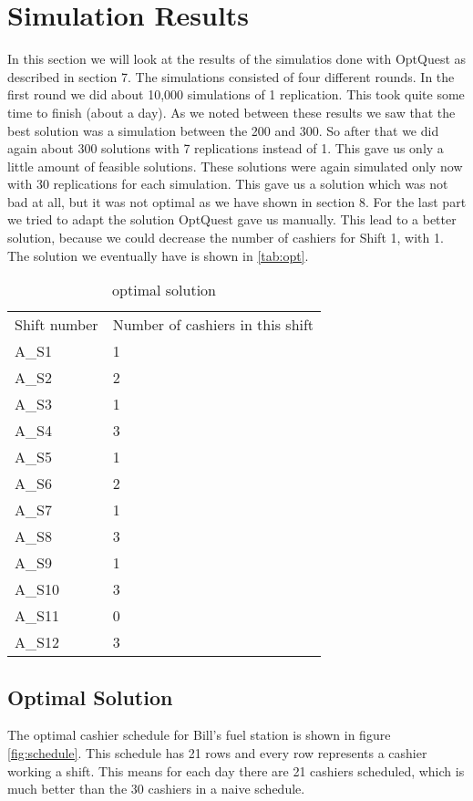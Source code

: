 \section{Simulation Results}
In this section we will look at the results of the simulatios done with OptQuest as described in section 7. 
The simulations consisted of four different rounds. 
In the first round we did about 10,000 simulations of 1 replication. 
This took quite some time to finish (about a day).
As we noted between these results we saw that the best solution was a simulation between the 200 and 300.
So after that we did again about 300 solutions with 7 replications instead of 1.
This gave us only a little amount of feasible solutions. 
These solutions were again simulated only now with 30 replications for each simulation.
This gave us a solution which was not bad at all, but it was not optimal as we have shown in section 8.
For the last part we tried to adapt the solution OptQuest gave us manually.
This lead to a better solution, because we could decrease the number of cashiers for Shift 1, with 1.
The solution we eventually have is shown in \autoref{tab:opt}.

\begin{table}
	\centering
	\caption{optimal solution}
	\begin{tabular}{l | l}
		Shift number & Number of cashiers in this shift\\
		A\_S1 & 1 \\
		A\_S2 & 2 \\
		A\_S3 & 1 \\
		A\_S4 & 3 \\
		A\_S5 & 1 \\
		A\_S6 & 2 \\
		A\_S7 & 1 \\
		A\_S8 & 3 \\
		A\_S9 & 1 \\
		A\_S10 & 3 \\
		A\_S11 & 0 \\
		A\_S12 & 3 \\
	\end{tabular}
	\label{tab:opt}
\end{table}

\subsection{Optimal Solution}
The optimal cashier schedule for Bill's fuel station is shown in figure \ref{fig:schedule}.
This schedule has 21 rows and every row represents a cashier working a shift.
This means for each day there are 21 cashiers scheduled, which is much better than the 30 cashiers in a naive schedule.

